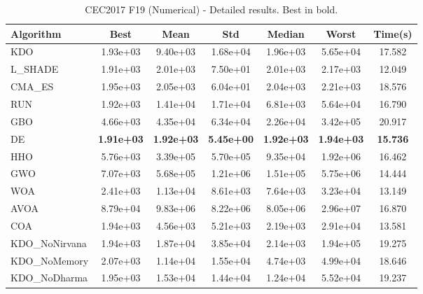 \begin{table}[H]
\centering\small
\caption{CEC2017 F19 (Numerical) - Detailed results. Best in bold.}
\label{tab:cec2017_F19}
\begin{tabular}{lcccccc}
\toprule
\textbf{Algorithm} & \textbf{Best} & \textbf{Mean} & \textbf{Std} & \textbf{Median} & \textbf{Worst} & \textbf{Time(s)} \\
\midrule
KDO & 1.93e+03 & 9.40e+03 & 1.68e+04 & 1.96e+03 & 5.65e+04 & 17.582 \\
L_SHADE & 1.91e+03 & 2.01e+03 & 7.50e+01 & 2.01e+03 & 2.17e+03 & 12.049 \\
CMA_ES & 1.95e+03 & 2.05e+03 & 6.04e+01 & 2.04e+03 & 2.21e+03 & 18.576 \\
RUN & 1.92e+03 & 1.41e+04 & 1.71e+04 & 6.81e+03 & 5.64e+04 & 16.790 \\
GBO & 4.66e+03 & 4.35e+04 & 6.34e+04 & 2.26e+04 & 3.42e+05 & 20.917 \\
DE & \textbf{1.91e+03} & \textbf{1.92e+03} & \textbf{5.45e+00} & \textbf{1.92e+03} & \textbf{1.94e+03} & \textbf{15.736} \\
HHO & 5.76e+03 & 3.39e+05 & 5.70e+05 & 9.35e+04 & 1.92e+06 & 16.462 \\
GWO & 7.07e+03 & 5.68e+05 & 1.21e+06 & 1.51e+05 & 5.75e+06 & 14.444 \\
WOA & 2.41e+03 & 1.13e+04 & 8.61e+03 & 7.64e+03 & 3.23e+04 & 13.149 \\
AVOA & 8.79e+04 & 9.83e+06 & 8.22e+06 & 8.05e+06 & 2.96e+07 & 16.870 \\
COA & 1.94e+03 & 4.56e+03 & 5.21e+03 & 2.19e+03 & 2.91e+04 & 13.581 \\
KDO_NoNirvana & 1.94e+03 & 1.87e+04 & 3.85e+04 & 2.14e+03 & 1.94e+05 & 19.275 \\
KDO_NoMemory & 2.07e+03 & 1.14e+04 & 1.55e+04 & 4.74e+03 & 4.99e+04 & 18.646 \\
KDO_NoDharma & 1.95e+03 & 1.53e+04 & 1.44e+04 & 1.24e+04 & 5.52e+04 & 19.237 \\
\bottomrule
\end{tabular}
\end{table}
